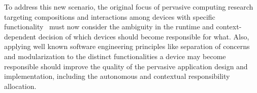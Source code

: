 %
%

To address this new scenario, the original focus of pervasive computing research targeting compositions and interactions among devices with specific functionality~\cite{Schumman} must now consider the ambiguity in the runtime and context-dependent decision of which devices should become responsible for what. %
Also, applying well known software engineering principles like separation of concerns and modularization to the distinct functionalities a device may become responsible should improve the quality of the pervasive application design and implementation, including the autonomous and contextual responsibility allocation.









